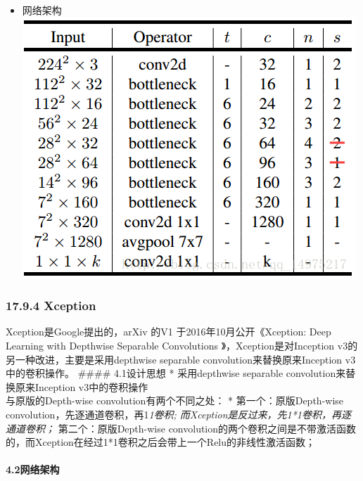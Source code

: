 \begin{itemize}
\item
  网络架构\\
  \includegraphics{./img/ch17/20.png}
\end{itemize}

\subsubsection{17.9.4 Xception}\label{xception}

Xception是Google提出的，arXiv 的V1 于2016年10月公开《Xception: Deep
Learning with Depthwise Separable Convolutions 》，Xception是对Inception
v3的另一种改进，主要是采用depthwise separable
convolution来替换原来Inception v3中的卷积操作。 \#\#\#\# 4.1设计思想 *
采用depthwise separable convolution来替换原来Inception v3中的卷积操作\\
与原版的Depth-wise convolution有两个不同之处： * 第一个：原版Depth-wise
convolution，先逐通道卷积，再1\emph{1卷积;
而Xception是反过来，先1*1卷积，再逐通道卷积； } 第二个：原版Depth-wise
convolution的两个卷积之间是不带激活函数的，而Xception在经过1*1卷积之后会带上一个Relu的非线性激活函数；

\paragraph{4.2网络架构}\label{ux7f51ux7edcux67b6ux6784-1}

